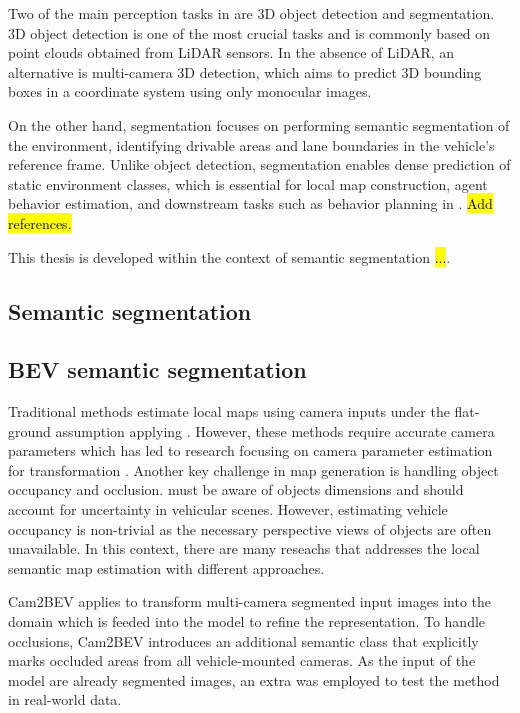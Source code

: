 Two of the main perception tasks in  are 3D object detection and  segmentation. 3D object detection is one of the most crucial tasks and is commonly based on point clouds obtained from LiDAR sensors. In the absence of LiDAR, an alternative is multi-camera 3D detection, which aims to predict 3D bounding boxes in a  coordinate system using only monocular images.

On the other hand,  segmentation focuses on performing semantic segmentation of the environment, identifying drivable areas and lane boundaries in the vehicle's reference frame. Unlike object detection,  segmentation enables dense prediction of static environment classes, which is essential for local map construction, agent behavior estimation, and downstream tasks such as behavior planning in . \hl{Add references.}

This thesis is developed within the context of  semantic segmentation \hl{...}.

\subsection{Semantic segmentation}

\subsection{BEV semantic segmentation}
Traditional methods \cite{3d_traffic_scene_understanding} estimate local  maps using camera inputs under the flat-ground assumption applying . However, these methods require accurate camera parameters which has led to research focusing on camera parameter estimation for  transformation \cite{BEV_params_estimation1} \cite{BEV_params_estimation2}. Another key challenge in  map generation is handling object occupancy and occlusion.  must be aware of objects dimensions and should account for uncertainty in vehicular scenes. However, estimating vehicle occupancy is non-trivial as the necessary perspective views of objects are often unavailable. In this context, there are many reseachs that addresses the local semantic map estimation with different approaches.

Cam2BEV \cite{Cam2BEV} applies  to transform multi-camera segmented input images into the  domain which is feeded into the model to refine the  representation. To handle occlusions, Cam2BEV introduces an additional semantic class that explicitly marks occluded areas from all vehicle-mounted cameras. As the input of the model are already segmented images, an extra  was employed to test the method in real-world data.  

